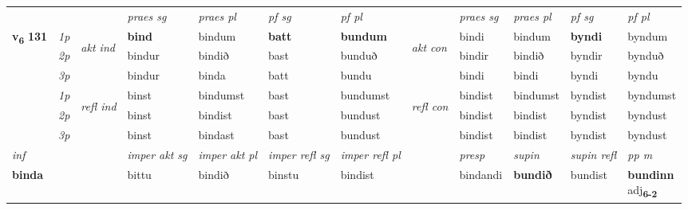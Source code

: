 \begin{longtable}[l]{X>{\footnotesize\itshape}llXXXXlXXXX}
\midrule

 & &   & \textit{praes sg}  & \textit{praes pl}    & \textit{ pf sg} & \textit{pf pl} & & \textit{praes sg}  & \textit{praes pl}    & \textit{pf sg} & \textit{pf pl }  \\ \cmidrule{4-7} \cmidrule{9-12}
 \multirow{2}{*}{{{\textbf{v{\textsubscript{6}}} \Large{\textbf{131}}}}}  & 1p & \multirow{3}{*}{\begin{turn}{90}\textit{akt ind}\end{turn}} & \textbf{bind} & bindum & \textbf{batt} & \textbf{bundum} & \multirow{3}{*}{\begin{turn}{90}\textit{akt con}\end{turn}} &bindi & bindum & \textbf{byndi} & byndum\\*
 & 2p &  &  bindur  & bindið & bast & bunduð & & bindir & bindið & byndir & bynduð \\*
 & 3p &  & bindur & binda & batt & bundu & & bindi & bindi& byndi & byndu \\*
\cmidrule{4-7} \cmidrule{9-12}
 & 1p & \multirow{3}{*}{\begin{turn}{90}\textit{refl ind}\end{turn}}  & binst & bindumst & bast & bundumst & \multirow{3}{*}{\begin{turn}{90}\textit{refl con}\end{turn}}  &bindist & bindumst & byndist & byndumst \\*
 & 2p &  & binst & bindist & bast & bundust & &bindist & bindist & byndist & byndust \\*
 & 3p  & & binst & bindast & bast & bundust & & bindist & bindist& byndist & byndust \\*
\cmidrule{4-7} \cmidrule{9-12}

   {\textit{inf}} & &  & \textit{imper akt sg} & \textit{imper akt pl} & \textit{imper refl sg} & \textit{imper refl pl} && \textit{presp} & \textit{supin} & \textit{supin refl} & \textit{pp m} \\*
  {\textbf{binda}} & && bittu  & bindið & binstu & bindist && bindandi &  \textbf{bundið} & bundist & \specialcell{\textbf{bundinn} \\ adj\textbf{\textsubscript{6-2}}} \\*

\midrule


\end{longtable}
